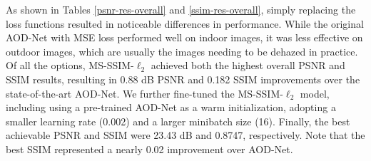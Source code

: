 \documentclass[10pt,twocolumn,letterpaper]{article}
\begin{document}
As shown in Tables \ref{psnr-res-overall} and \ref{ssim-res-overall}, simply replacing the loss functions resulted in noticeable differences in performance. While the original AOD-Net with MSE loss performed well on indoor images, it was less effective on outdoor images, which are usually the images needing to be dehazed in practice. Of all the options, MS-SSIM-$\ell_2$ achieved both the highest overall PSNR and SSIM results, resulting in 0.88 dB PSNR and 0.182 SSIM improvements over the state-of-the-art AOD-Net. We further fine-tuned the MS-SSIM-$\ell_2$ model, including using a pre-trained AOD-Net as a warm initialization, adopting a smaller learning rate (0.002) and a larger minibatch size (16). Finally, the best achievable PSNR and SSIM were 23.43 dB and 0.8747, respectively. Note that the best SSIM represented a nearly 0.02 improvement over AOD-Net. 

\end{document}
